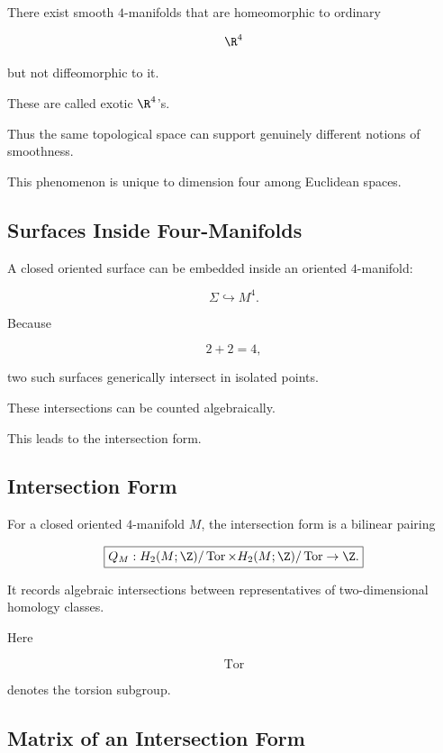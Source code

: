There exist smooth \(4\)-manifolds that are homeomorphic to ordinary

\[
\R^4
\]

but not diffeomorphic to it.

These are called exotic \(\R^4\)'s.

Thus the same topological space can support genuinely different notions of
smoothness.

This phenomenon is unique to dimension four among Euclidean spaces.

\subsection{Surfaces Inside Four-Manifolds}
\label{subsec:surfaces-inside-four-manifolds}

A closed oriented surface can be embedded inside an oriented \(4\)-manifold:

\[
\boxed{
\Sigma\hookrightarrow M^4.
}
\]

Because

\[
2+2=4,
\]

two such surfaces generically intersect in isolated points.

These intersections can be counted algebraically.

This leads to the intersection form.

\subsection{Intersection Form}
\label{subsec:intersection-form}

For a closed oriented \(4\)-manifold \(M\), the intersection form is a
bilinear pairing

\[
\boxed{
Q_M:
H_2(M;\Z)/\operatorname{Tor}
\times
H_2(M;\Z)/\operatorname{Tor}
\to
\Z.
}
\]

It records algebraic intersections between representatives of
two-dimensional homology classes.

Here

\[
\operatorname{Tor}
\]

denotes the torsion subgroup.

\subsection{Matrix of an Intersection Form}
\label{subsec:intersection-form-matrix}

